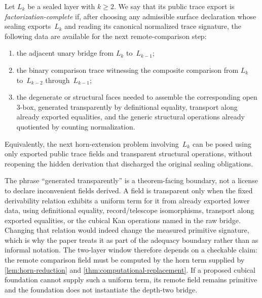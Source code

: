 \documentclass{lmcs}
\begin{document}
\begin{defi}
\label{def:factorization-complete}
Let $L_k$ be a sealed layer with $k \geq 2$. We say that its public trace
export is \emph{factorization-complete} if, after choosing any admissible
surface declaration whose sealing exports~$L_k$ and reading its canonical
normalized trace signature, the following data are available for the next
remote-comparison step:
\begin{enumerate}
  \item the adjacent unary bridge from $L_k$ to~$L_{k-1}$;
  \item the binary comparison trace witnessing the composite comparison from
  $L_k$ to~$L_{k-2}$ through~$L_{k-1}$;
  \item the degenerate or structural faces needed to assemble the corresponding
  open $3$-box, generated transparently by definitional equality, transport
  along already exported equalities, and the generic structural operations
  already quotiented by counting normalization.
\end{enumerate}
Equivalently, the next horn-extension problem involving~$L_k$ can be posed
using only exported public trace fields and transparent structural operations,
without reopening the hidden derivation that discharged the original sealing
obligations.
\end{defi}

\begin{rem}
\label{rem:transparency-boundary}
The phrase ``generated transparently'' is a theorem-facing boundary, not a
license to declare inconvenient fields derived. A field is transparent only
when the fixed derivability relation exhibits a uniform term for it from
already exported lower data, using definitional equality, record/telescope
isomorphisms, transport along exported equalities, or the cubical Kan
operations named in the raw bridge. Changing that relation would indeed change
the measured primitive signature, which is why the paper treats it as part of
the adequacy boundary rather than as informal notation. The two-layer window
therefore depends on a checkable claim: the remote comparison field must be
computed by the horn term supplied by \autoref{lem:horn-reduction} and
\autoref{thm:computational-replacement}. If a proposed cubical foundation
cannot supply such a uniform term, its remote field remains primitive and the
foundation does not instantiate the depth-two bridge.
\end{rem}
\end{document}
